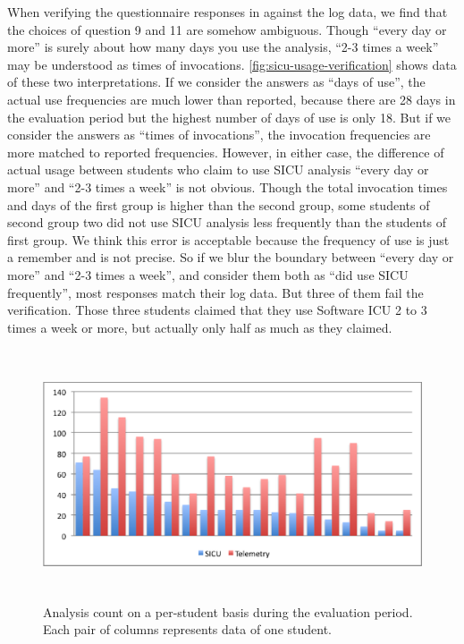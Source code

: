 \documentclass[11pt]{article}
\begin{document}
When verifying the questionnaire responses in  against the log data, we find that the choices of question 9 and 11 are somehow ambiguous. Though ``every day or more'' is surely about how many days you use the analysis, ``2-3 times a week'' may be understood as times of invocations. \autoref{fig:sicu-usage-verification} shows data of these two interpretations. If we consider the answers as ``days of use'', the actual use frequencies are much lower than reported, because there are 28 days in the evaluation period but the highest number of days of use is only 18. But if we consider the answers as ``times of invocations'', the invocation frequencies are more matched to reported frequencies. However, in either case, the difference of actual usage between students who claim to use SICU analysis ``every day or more'' and ``2-3 times a week'' is not obvious. Though the total invocation times and days of the first group is higher than the second group, some students of second group two did not use SICU analysis less frequently than the students of first group. We think this error is acceptable because the frequency of use is just a remember and is not precise. So if we blur the boundary between ``every day or more'' and ``2-3 times a week'', and consider them both as ``did use SICU frequently'', most responses match their log data. But three of them fail the verification. Those three students claimed that they use Software ICU 2 to 3 times a week or more, but actually only half as much as they claimed.

\begin{figure}[htbp] %
   \centering
   \includegraphics[height=20em]{per-student-all} 
   \caption{Analysis count on a per-student basis during the evaluation period. Each pair of columns represents data of one student.}
   \label{fig:per-student-all}
\end{figure}
\end{document}
